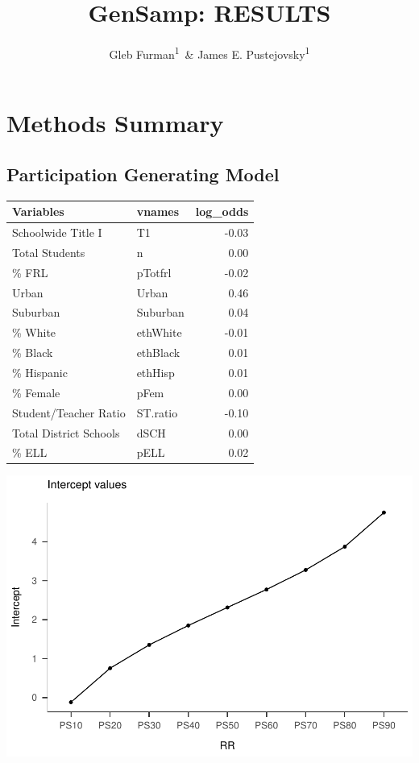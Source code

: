 \documentclass[man,floatsintext]{apa6}
\title{GenSamp: RESULTS}
\author{Gleb Furman\textsuperscript{1}~\& James E. Pustejovsky\textsuperscript{1}}
\date{}
\affiliation{
\vspace{0.5cm}
\textsuperscript{1} University of Texas at Austin}
\begin{document}
\maketitle

\hypertarget{methods-summary}{%
\section{Methods Summary}\label{methods-summary}}

\hypertarget{participation-generating-model}{%
\subsection{Participation Generating Model}\label{participation-generating-model}}

\begin{table}[H]
\centering
\begin{tabular}{l|l|r}
\hline
Variables & vnames & log\_odds\\
\hline
Schoolwide Title I & T1 & -0.03\\
\hline
Total Students & n & 0.00\\
\hline
\% FRL & pTotfrl & -0.02\\
\hline
Urban & Urban & 0.46\\
\hline
Suburban & Suburban & 0.04\\
\hline
\% White & ethWhite & -0.01\\
\hline
\% Black & ethBlack & 0.01\\
\hline
\% Hispanic & ethHisp & 0.01\\
\hline
\% Female & pFem & 0.00\\
\hline
Student/Teacher Ratio & ST.ratio & -0.10\\
\hline
Total District Schools & dSCH & 0.00\\
\hline
\% ELL & pELL & 0.02\\
\hline
\end{tabular}
\end{table}

\includegraphics{Results_files/figure-latex/unnamed-chunk-3-1.pdf}
\end{document}
